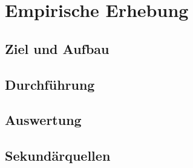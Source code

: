 \section{Empirische Erhebung}

\subsection{Ziel und Aufbau}

\subsection{Durchführung}

\subsection{Auswertung}

\subsection{Sekundärquellen}